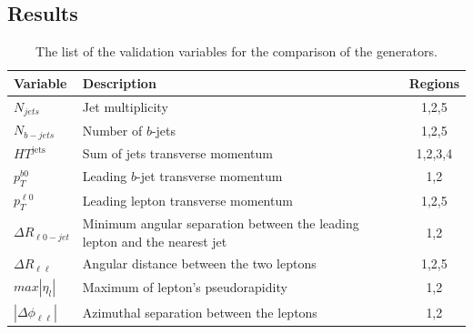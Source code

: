 



\subsection{Results}
\begin{table}[]
\begin{center}
\caption{\label{tab:ttw_varlist}
The list of the validation variables for the comparison of the \ttW generators.}
\vspace{0.25cm}
{\small
\setlength\tabcolsep{1.5pt}
\begin{tabular}{l|l|c}
\hline\hline
Variable & Description & Regions \\ \hline
$N_{jets}$   &     Jet multiplicity        &      1,2,5   \\ %
 $N_{b-jets}$       &     Number of  $b$-jets       &   1,2,5      \\ %
$HT^{\text{jets}}$      &   Sum of jets transverse momentum         &  1,2,3,4       \\ %
$p_T^{b0}$       &      Leading $b$-jet transverse momentum       &   1,2      \\ %
 $p_T^{\ell 0}$      &   Leading lepton transverse momentum           &     1,2,5    \\ %
$\Delta R _{ \ell 0-jet }$      &     Minimum angular separation between the leading lepton and the nearest jet         &  1,2       \\ %
$\Delta R _{\ell \ell }$      &       Angular distance between the two leptons      &    1,2,5    \\ %
$max |\eta _l|$      &      Maximum of lepton's pseudorapidity       &     1,2    \\ %
    $|\Delta \phi _{\ell \ell }|$    &    Azimuthal separation between the leptons         & 1,2    \\
    \hline\hline    
\end{tabular}
}
\end{center}
\end{table}



